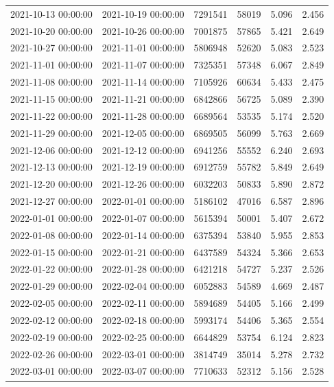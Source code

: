 \begin{tabular}{llrrrr}
2021-10-13 00:00:00 & 2021-10-19 00:00:00 & 7291541 & 58019 & 5.096 & 2.456 \\
2021-10-20 00:00:00 & 2021-10-26 00:00:00 & 7001875 & 57865 & 5.421 & 2.649 \\
2021-10-27 00:00:00 & 2021-11-01 00:00:00 & 5806948 & 52620 & 5.083 & 2.523 \\
2021-11-01 00:00:00 & 2021-11-07 00:00:00 & 7325351 & 57348 & 6.067 & 2.849 \\
2021-11-08 00:00:00 & 2021-11-14 00:00:00 & 7105926 & 60634 & 5.433 & 2.475 \\
2021-11-15 00:00:00 & 2021-11-21 00:00:00 & 6842866 & 56725 & 5.089 & 2.390 \\
2021-11-22 00:00:00 & 2021-11-28 00:00:00 & 6689564 & 53535 & 5.174 & 2.520 \\
2021-11-29 00:00:00 & 2021-12-05 00:00:00 & 6869505 & 56099 & 5.763 & 2.669 \\
2021-12-06 00:00:00 & 2021-12-12 00:00:00 & 6941256 & 55552 & 6.240 & 2.693 \\
2021-12-13 00:00:00 & 2021-12-19 00:00:00 & 6912759 & 55782 & 5.849 & 2.649 \\
2021-12-20 00:00:00 & 2021-12-26 00:00:00 & 6032203 & 50833 & 5.890 & 2.872 \\
2021-12-27 00:00:00 & 2022-01-01 00:00:00 & 5186102 & 47016 & 6.587 & 2.896 \\
2022-01-01 00:00:00 & 2022-01-07 00:00:00 & 5615394 & 50001 & 5.407 & 2.672 \\
2022-01-08 00:00:00 & 2022-01-14 00:00:00 & 6375394 & 53840 & 5.955 & 2.853 \\
2022-01-15 00:00:00 & 2022-01-21 00:00:00 & 6437589 & 54324 & 5.366 & 2.653 \\
2022-01-22 00:00:00 & 2022-01-28 00:00:00 & 6421218 & 54727 & 5.237 & 2.526 \\
2022-01-29 00:00:00 & 2022-02-04 00:00:00 & 6052883 & 54589 & 4.669 & 2.487 \\
2022-02-05 00:00:00 & 2022-02-11 00:00:00 & 5894689 & 54405 & 5.166 & 2.499 \\
2022-02-12 00:00:00 & 2022-02-18 00:00:00 & 5993174 & 54406 & 5.365 & 2.554 \\
2022-02-19 00:00:00 & 2022-02-25 00:00:00 & 6644829 & 53754 & 6.124 & 2.823 \\
2022-02-26 00:00:00 & 2022-03-01 00:00:00 & 3814749 & 35014 & 5.278 & 2.732 \\
2022-03-01 00:00:00 & 2022-03-07 00:00:00 & 7710633 & 52312 & 5.156 & 2.528 \\

\end{tabular}
